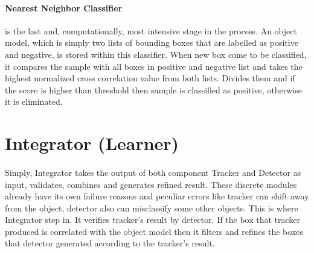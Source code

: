 \documentclass{report}
\begin{document}
        \paragraph{Nearest Neighbor Classifier} is the last and, computationally, most intensive stage in the process.
            An object model, which is simply two lists of bounding boxes that are labelled as positive and negative, is stored
            within this classifier. When new box come to be classified, it compares the sample with all
            boxes in positive and negative list and takes the highest normalized cross correlation value from both lists.
            Divides them and if the score is higher than threshold then sample is classified as positive,
            otherwise it is eliminated.
    \section{Integrator (Learner)}
        \paragraph{}
            Simply, Integrator takes the output of both component Tracker and Detector as input, validates, combines
            and generates refined result. These discrete modules already have its own failure reasons
            and peculiar errors like tracker can shift away from the object, detector also can misclassify some other objects. This is
            where Integrator step in. It verifies tracker's result by detector. If the box that tracker produced is correlated with the object model
            then it filters and refines the boxes that detector generated according to the tracker's result.
\end{document}
